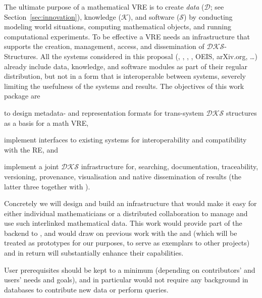 \def\DKS{\ensuremath{\mathcal{DKS}}\xspace}

\begin{workpackage}[id=dksbases,%
  title=Data/Knowledge/Software-Bases,lead=JU,
  ZHRM=12,JURM=36,UWRM=25,SARM=10,LLRM=2,PSRM=4]

\begin{wpobjectives}
  The ultimate purpose of a mathematical VRE is to create \emph{data} ($\mathcal{D}$; see
  Section~\ref{sec:innovation}), knowledge ($\mathcal{K}$), and software ($\mathcal{S}$)
  by conducting modeling world situations, computing mathematical objects, and running
  computational experiments. To be effective a VRE needs an infrastructure that supports
  the creation, management, access, and dissemination of \DKS-Structures.  All
  the systems considered in this proposal (\GAP, \Sage, \Pari, \Singular, OEIS, arXiv.org,
  \ldots) already include data, knowledge, and software modules as part of their regular
  distribution, but not in a form that is interoperable between systems, severely limiting
  the usefulness of the systems and results. The objectives of this work package are
\begin{compactenum}
\item to design metadata- and representation formats for trans-system $\mathcal{DKS}$
  structures as a basis for a math VRE, 
\item implement interfaces to existing systems for interoperability and compatibility with
  the RE, and
\item implement a joint \DKS infrastructure for, searching, documentation, traceability,
  versioning, provenance, visualisation and native dissemination of \TheProject results
  (the latter three together with ).
\end{compactenum}
Concretely we will design and build an infrastructure that would make it easy for either
individual mathematicians or a distributed collaboration to manage and use such
interlinked mathematical data. This work would provide part of the backend to ,
and would draw on previous work with the \LMFDB and \FindStat (which will be treated as
prototypes for our purposes, to serve as exemplars to other projects) and in return will
substantially enhance their capabilities.

User prerequisites should be kept to a minimum (depending on contributors' and users'
needs and goals), and in particular would not require any background in databases to
contribute new data or perform queries.
\end{wpobjectives}


\end{workpackage}
